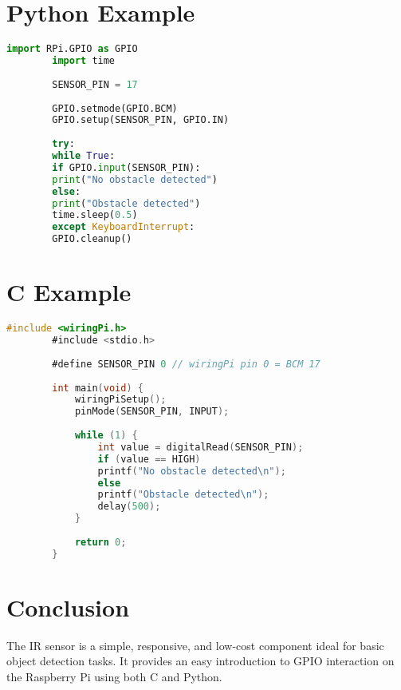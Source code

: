 \documentclass{article}
\begin{document}
	\section{Python Example}
	\begin{lstlisting}[language=Python]
		import RPi.GPIO as GPIO
		import time
		
		SENSOR_PIN = 17
		
		GPIO.setmode(GPIO.BCM)
		GPIO.setup(SENSOR_PIN, GPIO.IN)
		
		try:
		while True:
		if GPIO.input(SENSOR_PIN):
		print("No obstacle detected")
		else:
		print("Obstacle detected")
		time.sleep(0.5)
		except KeyboardInterrupt:
		GPIO.cleanup()
	\end{lstlisting}
	
	\section{C Example}
	\begin{lstlisting}[language=C]
		#include <wiringPi.h>
		#include <stdio.h>
		
		#define SENSOR_PIN 0 // wiringPi pin 0 = BCM 17
		
		int main(void) {
			wiringPiSetup();
			pinMode(SENSOR_PIN, INPUT);
			
			while (1) {
				int value = digitalRead(SENSOR_PIN);
				if (value == HIGH)
				printf("No obstacle detected\n");
				else
				printf("Obstacle detected\n");
				delay(500);
			}
			
			return 0;
		}
	\end{lstlisting}
	
	\section{Conclusion}
	The IR sensor is a simple, responsive, and low-cost component ideal for basic object detection tasks. It provides an easy introduction to GPIO interaction on the Raspberry Pi using both C and Python.
	
\end{document}
